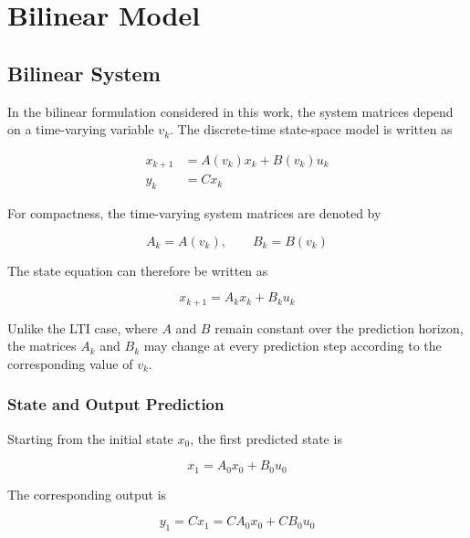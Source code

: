 \chapter{Bilinear Model}
\section{Bilinear System}
\label{sec:bilinear_system}

In the bilinear formulation considered in this work, the system matrices depend on a time-varying variable \(v_k\). The discrete-time state-space model is written as

\begin{align}
    x_{k+1} &= A(v_k)x_k + B(v_k)u_k \label{eq:bilinear_state}\\
    y_k &= Cx_k \label{eq:bilinear_output}
\end{align}

For compactness, the time-varying system matrices are denoted by

\begin{equation}
    A_k = A(v_k),
    \qquad
    B_k = B(v_k)
\end{equation}

The state equation can therefore be written as

\begin{equation}
    x_{k+1} = A_k x_k + B_k u_k
    \label{eq:bilinear_compact}
\end{equation}

Unlike the LTI case, where \(A\) and \(B\) remain constant over the prediction horizon, the matrices \(A_k\) and \(B_k\) may change at every prediction step according to the corresponding value of \(v_k\).

\subsection{State and Output Prediction}

Starting from the initial state \(x_0\), the first predicted state is

\begin{equation}
    x_1 = A_0x_0 + B_0u_0
\end{equation}

The corresponding output is

\begin{equation}
    y_1
    =
    Cx_1
    =
    CA_0x_0 + CB_0u_0
    \label{eq:bilinear_y1}
\end{equation}

